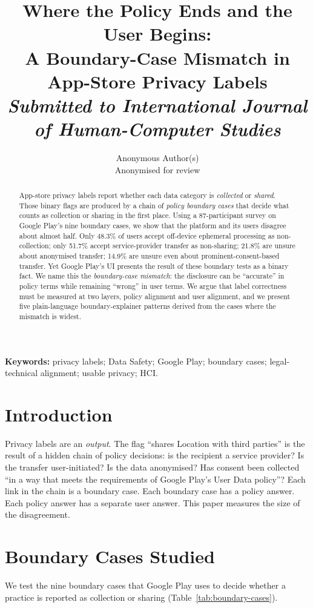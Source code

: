 \documentclass[11pt,a4paper]{article}
\title{\textbf{Where the Policy Ends and the User Begins:\\
A Boundary-Case Mismatch in App-Store Privacy Labels}\\[3pt]
\large \textit{Submitted to International Journal of Human-Computer Studies}}
\author{Anonymous Author(s)\\\small Anonymised for review}\date{}
\begin{document}
\maketitle

\begin{abstract}\noindent
App-store privacy labels report whether each data category is \emph{collected}
or \emph{shared}. Those binary flags are produced by a chain of
\emph{policy boundary cases} that decide what counts as collection or sharing
in the first place. Using a 87-participant survey on Google Play's nine
boundary cases, we show that the platform and its users disagree about almost
half. Only 48.3\% of users accept off-device ephemeral processing as
non-collection; only 51.7\% accept service-provider transfer as non-sharing;
21.8\% are unsure about anonymised transfer; 14.9\% are unsure even about
prominent-consent-based transfer. Yet Google Play's UI presents the result of
these boundary tests as a binary fact. We name this the \emph{boundary-case
mismatch}: the disclosure can be ``accurate'' in policy terms while remaining
``wrong'' in user terms. We argue that label correctness must be measured at
two layers, policy alignment and user alignment, and we present five
plain-language boundary-explainer patterns derived from the cases where the
mismatch is widest.
\end{abstract}

\noindent\textbf{Keywords:} privacy labels; Data Safety; Google Play;
boundary cases; legal-technical alignment; usable privacy; HCI.

\section{Introduction}
Privacy labels are an \emph{output}. The flag ``shares Location with third
parties'' is the result of a hidden chain of policy decisions: is the recipient
a service provider? Is the transfer user-initiated? Is the data anonymised?
Has consent been collected ``in a way that meets the requirements of Google
Play's User Data policy''? Each link in the chain is a boundary case. Each
boundary case has a policy answer. Each policy answer has a separate user
answer. This paper measures the size of the disagreement.

\section{Boundary Cases Studied}
We test the nine boundary cases that Google Play uses to decide whether a
practice is reported as collection or sharing
(Table~\ref{tab:boundary-cases}).
\end{document}
